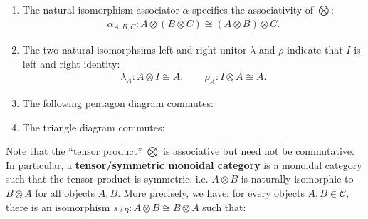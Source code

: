 \documentclass[openany, a4paper]{amsbook}
\theoremstyle{definition}
\numberwithin{equation}{chapter}
\begin{document}
\begin{enumerate}
    \item The natural isomorphism associator $\alpha$ specifies the associativity of $\bigotimes$:
    \begin{align*}
        \alpha_{A,B,C}: A \otimes (B \otimes C) \cong (A \otimes B) \otimes C.
    \end{align*}
    \item The two natural isomorphsims left and right unitor $\lambda$ and $\rho$ indicate that $I$ is left and right identity:
    \begin{align*}
        \lambda_A: A \otimes I \cong A, \qquad \rho_A: I \otimes A \cong A.
    \end{align*}
    \item The following pentagon diagram commutes: 
    \begin{center}
    \end{center}
    \item The triangle diagram commutes:
    \begin{center}
    \end{center}
\end{enumerate}
Note that the ``tensor product'' $\bigotimes$ is associative but need not be commutative. In particular, a \textbf{tensor/symmetric monoidal category} is a monoidal category such that the tensor product is symmetric, i.e. $A\otimes B$ is naturally isomorphic to $B\otimes A$ for all objects $A, B$. More precisely, we have: for every objects $A, B \in \mathcal{C}$, there is an isomorphism $s_{AB}:A\otimes B \cong B\otimes A$ such that:
\end{document}
